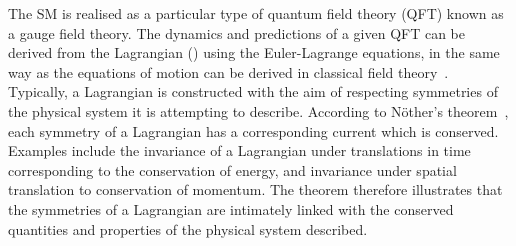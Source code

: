 The SM is realised as a particular type of quantum field theory (QFT) known as a gauge field theory.
The dynamics and predictions of a given QFT can be derived from the Lagrangian (\Like)
using the Euler-Lagrange equations, 
in the same way as the equations of motion can be derived in classical field theory~\cite{Peskin}.
Typically, a Lagrangian is constructed with the aim of respecting symmetries of the physical system
it is attempting to describe.
According to N\"other's theorem~\cite{Nother}, 
each symmetry of a Lagrangian has a corresponding current which is conserved.
Examples include the invariance of a Lagrangian under translations in time 
corresponding to the conservation of energy, 
and invariance under spatial translation to conservation of momentum.
The theorem therefore illustrates that the symmetries of a Lagrangian 
are intimately linked with the conserved quantities and properties of the physical system described.

